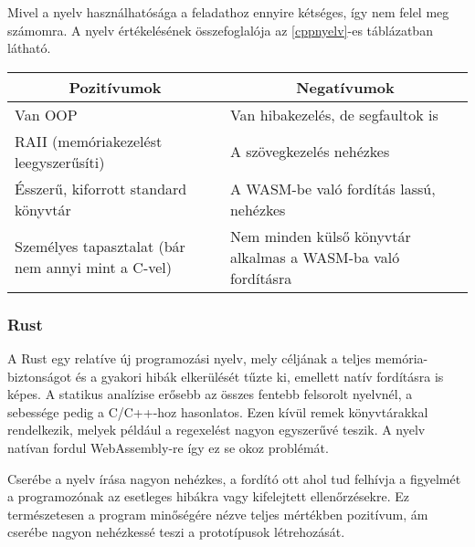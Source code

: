 Mivel a nyelv használhatósága a feladathoz ennyire kétséges, így nem felel meg számomra. A nyelv értékelésének összefoglalója az \ref{cppnyelv}-es táblázatban látható.

\begin{center}
  \begin{tabularx}{\textwidth}{X X}
    \hline
    \multicolumn{1}{c}{\bfseries{Pozitívumok}}         & \multicolumn{1}{c}{\bfseries{Negatívumok}}                                             \\
    \hline
    Van OOP                                            & Van hibakezelés, de segfaultok is \\
    RAII (memóriakezelést leegyszerűsíti)              & A szövegkezelés nehézkes\\
    Ésszerű, kiforrott standard könyvtár               & A WASM-be való fordítás lassú, nehézkes                      \\
    Személyes tapasztalat (bár nem annyi mint a C-vel) & Nem minden külső könyvtár alkalmas a WASM-ba való fordításra                           \\
    \hline
  \end{tabularx}
\end{center}

\subsubsection{Rust}

\cite{rust}

A Rust egy relatíve új programozási nyelv, mely céljának a teljes memória-biztonságot és a gyakori hibák elkerülését tűzte ki, emellett natív fordításra is képes. A statikus analízise erősebb az összes fentebb felsorolt nyelvnél, a sebessége pedig a C/C++-hoz hasonlatos. Ezen kívül remek könyvtárakkal rendelkezik, melyek például a regexelést nagyon egyszerűvé teszik. A nyelv natívan fordul WebAssembly-re így ez se okoz problémát.

Cserébe a nyelv írása nagyon nehézkes, a fordító ott ahol tud felhívja a figyelmét a programozónak az esetleges hibákra vagy kifelejtett ellenőrzésekre. Ez természetesen a program minőségére nézve teljes mértékben pozitívum, ám cserébe nagyon nehézkessé teszi a prototípusok létrehozását.

